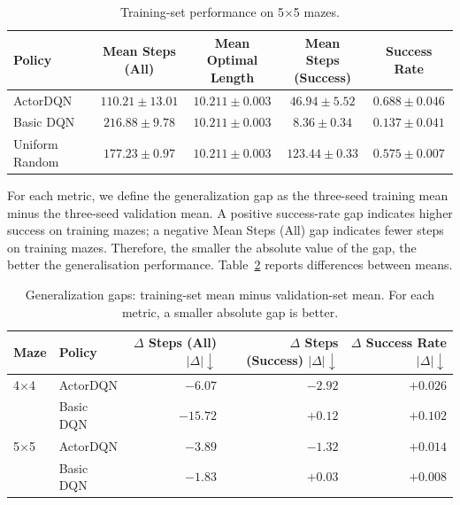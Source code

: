 \documentclass[a4paper,12pt]{article}
\begin{document}
\begin{table}[htbp]
    \centering
    \caption{Training-set performance on 5$\times$5 mazes.}
    \small
    \setlength{\tabcolsep}{4pt}
    \begin{tabular}{lcccc}
        \hline
        Policy & \shortstack{Mean Steps\\(All)} & \shortstack{Mean Optimal\\Length} & \shortstack{Mean Steps\\(Success)} & Success Rate \\
        \hline
        ActorDQN & $\mathbf{110.21 \pm 13.01}$ & $10.211 \pm 0.003$ & $46.94 \pm 5.52$ & $\mathbf{0.688 \pm 0.046}$ \\
        Basic DQN & $216.88 \pm 9.78$ & $10.211 \pm 0.003$ & $\mathbf{8.36 \pm 0.34}$ & $0.137 \pm 0.041$ \\
        Uniform Random & $177.23 \pm 0.97$ & $10.211 \pm 0.003$ & $123.44 \pm 0.33$ & $0.575 \pm 0.007$ \\
        \hline
    \end{tabular}
    \label{tab:train_maze5x5}
\end{table}

For each metric, we define the generalization gap as the three-seed training mean minus the three-seed validation mean. A positive success-rate gap indicates higher success on training mazes; a negative Mean Steps (All) gap indicates fewer steps on training mazes. Therefore, the smaller the absolute value of the gap, the better the generalisation performance. Table~\ref{tab:generalization_gap} reports differences between means.

\begin{table}[htbp]
    \centering
    \small
    \caption{Generalization gaps: training-set mean minus validation-set mean. For each metric, a smaller absolute gap is better.}
    \begin{tabular}{llrrr}
        \hline
        Maze & Policy & \shortstack{$\Delta$ Steps (All)\\$|\Delta|\downarrow$} & \shortstack{$\Delta$ Steps (Success)\\$|\Delta|\downarrow$} & \shortstack{$\Delta$ Success Rate\\$|\Delta|\downarrow$} \\
        \hline
        4$\times$4 & ActorDQN & $\mathbf{-6.07}$ & $-2.92$ & $\mathbf{+0.026}$ \\
        & Basic DQN & $-15.72$ & $\mathbf{+0.12}$ & $+0.102$ \\
        \hline
        5$\times$5 & ActorDQN & $-3.89$ & $-1.32$ & $+0.014$ \\
        & Basic DQN & $\mathbf{-1.83}$ & $\mathbf{+0.03}$ & $\mathbf{+0.008}$ \\
        \hline
    \end{tabular}
    \label{tab:generalization_gap}
\end{table}
\end{document}
